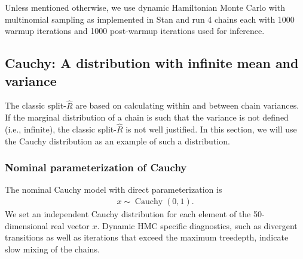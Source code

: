\documentclass[american,]{article}
\let\oldparagraph\paragraph
\renewcommand{\paragraph}[1]{\oldparagraph{#1}\mbox{}}
\DeclareMathOperator{\Cauchy}{Cauchy}
\begin{document}
Unless mentioned otherwise, we use dynamic Hamiltonian Monte Carlo with
multinomial sampling \citep{betancourt2017conceptual} as implemented
in Stan \citep{StanManual.2.18.0} and run 4 chains each with 1000
warmup iterations and 1000 post-warmup iterations used for inference.

\hypertarget{cauchy-a-distribution-with-infinite-mean-and-variance}{%
\subsection{Cauchy: A distribution with infinite mean and
variance}\label{cauchy-a-distribution-with-infinite-mean-and-variance}}

The classic split-\(\widehat{R}\) are based on calculating
within and between chain variances. If the marginal distribution of a
chain is such that the variance is not defined (i.e., infinite), the
classic split-\(\widehat{R}\) is not well justified. In this
section, we will use the Cauchy distribution as an example of such a
distribution. 

\hypertarget{nominal-parameterization-of-cauchy}{%
\subsubsection*{Nominal parameterization of
Cauchy}\label{nominal-parameterization-of-cauchy}}






The nominal Cauchy model with direct parameterization is
\begin{align}
  x \sim \Cauchy(0,1).
\end{align}
We set an independent Cauchy distribution for each element of the 50-dimensional 
real vector $x$. Dynamic HMC specific diagnostics, such as divergent
transitions as well as iterations that exceed the maximum treedepth,
indicate slow mixing of the chains.
\end{document}
